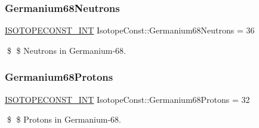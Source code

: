 \subsubsection{\texorpdfstring{Germanium68\+Neutrons}{Germanium68Neutrons}}
{\footnotesize\ttfamily \mbox{\hyperlink{group___isotope_const-_macros_ga5f18360b3e99483a35c32d789e62621c}{I\+S\+O\+T\+O\+P\+E\+C\+O\+N\+S\+T\+\_\+\+I\+NT}} Isotope\+Const\+::\+Germanium68\+Neutrons = 36}

\$ \$ Neutrons in Germanium-\/68. \mbox{\label{group___isotope_const-_germanium-_ge68_ga4a29e3ae32e1e43b3c8cade729d12810}} 
\subsubsection{\texorpdfstring{Germanium68\+Protons}{Germanium68Protons}}
{\footnotesize\ttfamily \mbox{\hyperlink{group___isotope_const-_macros_ga5f18360b3e99483a35c32d789e62621c}{I\+S\+O\+T\+O\+P\+E\+C\+O\+N\+S\+T\+\_\+\+I\+NT}} Isotope\+Const\+::\+Germanium68\+Protons = 32}

\$ \$ Protons in Germanium-\/68. 
